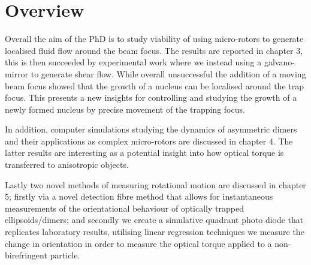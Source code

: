 \section{Overview}
Overall the aim of the PhD is to study viability of using micro-rotors to
generate localised fluid flow around the beam focus. The results are reported
in chapter 3, this is then succeeded by experimental work where we instead 
using a galvano-mirror to generate shear flow. While overall unsuccessful
the addition of a moving beam focus showed that the growth of a nucleus can be localised around the trap focus. This presents a new insights for controlling
and studying the growth of a newly formed nucleus by precise movement of the
trapping focus.

In addition, computer simulations studying the dynamics of asymmetric dimers 
and their applications as complex micro-rotors are discussed in chapter 4. 
The latter results are interesting as a potential insight into how optical
torque is transferred to anisotropic objects.

Lastly two novel methods of measuring rotational motion are discussed in 
chapter 5; firstly via a novel detection fibre method that allows for 
instantaneous measurements of the orientational behaviour of optically 
trapped ellipsoids/dimers; and secondly we create a simulative quadrant 
photo diode that replicates laboratory results, utilising linear regression 
techniques we measure the change in orientation in order to measure the 
optical torque applied to a non-birefringent particle. 
